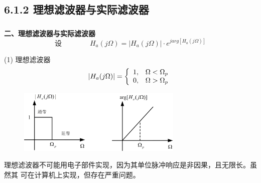 \documentclass[notheorems,compress,mathserif,table]{beamer}
\begin{document}

\subsection{6.1.2 理想滤波器与实际滤波器}
\begin{frame}\frametitle{}%
\textbf{\heiti 二、理想滤波器与实际滤波器}
$$\mbox{设}\quad\quad\quad\quad  H_{a}(j\Omega)=|H_{a}(j\Omega)|\cdot e^{jarg[H_{a}(j\Omega)]}$$

 (1) 理想滤波器
   $$|H_{a}(j\Omega)| = \left\{\begin{array}
         {r@{,\quad}l}
         1 &\mbox{$\Omega < \Omega_{p}$}\\
         0 &\mbox{$\Omega > \Omega_{p}$}
        \end{array} \right.
   $$

   \begin{figure}[h]
       \centering
       \includegraphics[width=0.7\textwidth]{fig2lxlbqtx.jpg}
   \end{figure}
  理想滤波器不可能用电子部件实现，因为其单位脉冲响应是非因果，且无限长。虽然其
   可在计算机上实现，但存在严重问题。

\end{frame}
\end{document}
